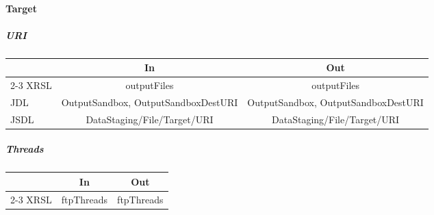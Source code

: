 \documentclass{article}
\newcommand{\subsubsubsection}[1]{\paragraph{#1}}
\newcommand{\subsubsubsubsection}[1]{\subparagraph{#1}}
\newenvironment{inouttabular}%
{\begin{center}\begin{tabular}{l>{\ttfamily\footnotesize}c>{\ttfamily\footnotesize}c}%
\toprule
& \textnormal{\normalsize{In}} & \textnormal{\normalsize{Out}}\\ \cmidrule{2-3}}
{\bottomrule\end{tabular}\end{center}}
\begin{document}

\subsubsubsection{Target}
\subsubsubsubsection{URI}
\begin{inouttabular}
XRSL & outputFiles & outputFiles\\
JDL & OutputSandbox, OutputSandboxDestURI & OutputSandbox, OutputSandboxDestURI\\
JSDL & DataStaging/File/Target/URI & DataStaging/File/Target/URI\\
\end{inouttabular}

\subsubsubsubsection{Threads}
\begin{inouttabular}
XRSL & ftpThreads &ftpThreads\\
\end{inouttabular}



\end{document}
